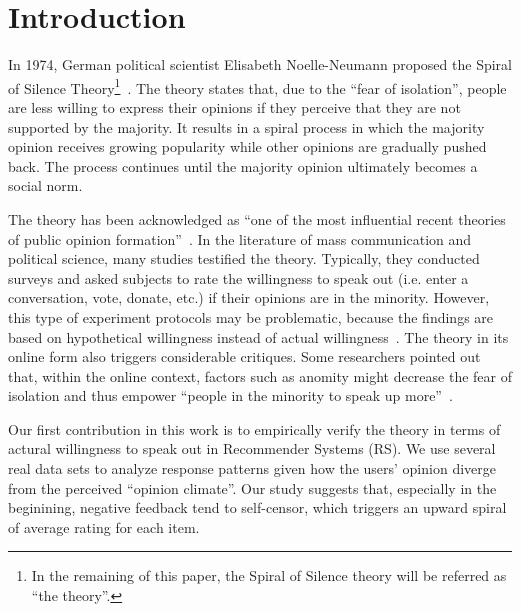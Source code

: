 \documentclass{sig-alternate}
\begin{document}




\section{Introduction}\label{sec:introduction}

In 1974, German political scientist Elisabeth Noelle-Neumann proposed the Spiral of Silence Theory\footnote{In the remaining of this paper, the Spiral of Silence theory will be referred as ``the theory''.}~\cite{Neolle-Neumann1993spiral}. The theory states that, due to the ``fear of isolation'', people are less willing to express their opinions if they perceive that they are not supported by the majority. It results in a spiral process in which the majority opinion receives growing popularity while other opinions are gradually pushed back. The process continues until the majority opinion ultimately becomes a social norm.

The theory has been acknowledged as ``one of the most influential recent theories of public opinion formation''~\cite{Kennamer1990Self}. In the literature of mass communication and political science, many studies testified the theory. Typically, they conducted surveys and asked subjects to rate the willingness to speak out (i.e. enter a conversation, vote, donate, etc.) if their opinions are in the minority. However, this type of experiment protocols may be problematic, because the findings are based on hypothetical willingness instead of actual willingness~\cite{Carroll1997Perceived}. The theory in its online form also triggers considerable critiques. Some researchers pointed out that, within the online context, factors such as anomity might decrease the fear of isolation and thus empower ``people in the minority to speak up more''~\cite{mcdevitt2003spiral}.

Our first contribution in this work is to empirically verify the theory in terms of actural willingness to speak out in Recommender Systems (RS). We use several real data sets to analyze response patterns given how the users' opinion diverge from the perceived ``opinion climate''. Our study suggests that, especially in the beginining, negative feedback tend to self-censor,  which triggers an upward spiral of average rating for each item.
\end{document}
